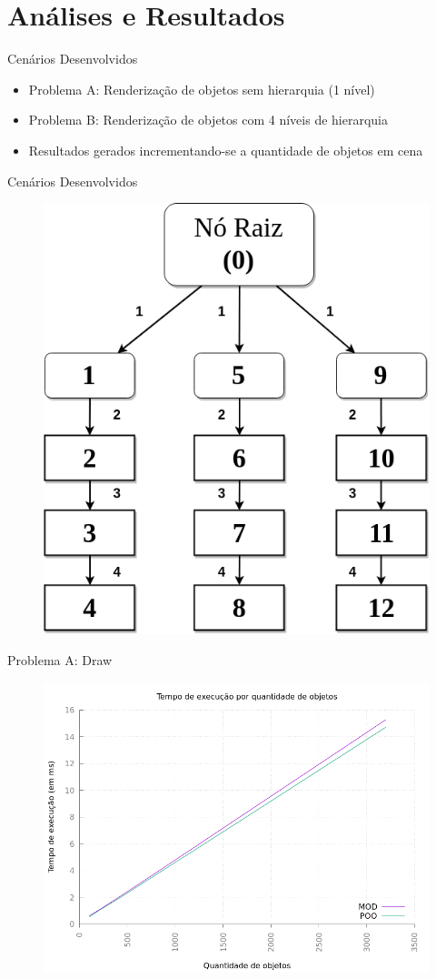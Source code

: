 \documentclass{beamer}
\begin{document}
\section{Análises e Resultados}

\frame{\tableofcontents[currentsection]}

\begin{frame}{Cenários Desenvolvidos}
    \begin{itemize}
        \item Problema A: Renderização de objetos sem hierarquia (1 nível)
        \item Problema B: Renderização de objetos com 4 níveis de hierarquia
        \item Resultados gerados incrementando-se a quantidade de objetos em cena
    \end{itemize}
\end{frame}

\begin{frame}{Cenários Desenvolvidos}
    \begin{figure}[h]
        \centering
        \includegraphics[width =.45\textwidth]{figuras/problemBscheme}
        \par\medskip
    \end{figure}
\end{frame}

\begin{frame}{Problema A: Draw}
    \begin{figure}[h!]
        \centering
        \includegraphics[width =.8\textwidth]{figuras/drawv1graph}
        \par\medskip
    \end{figure}
\end{frame}
\end{document}
